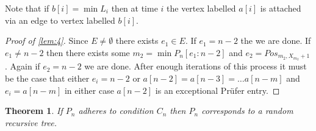 \documentclass[10pt]{article} %
\newtheorem{thm}{Theorem}[section]
\newtheorem{lem}[thm]{Lemma}
\theoremstyle{definition}
\DeclareMathOperator{\Pos}{Pos}
\begin{document}
Note that if $b[i] = \min L_{i}$ then at time $i$ the vertex labelled $a[i]$ is attached via an edge to vertex labelled $b[i]$. 

\begin{proof}[Proof of \ref{lem:4}]
Since $E \neq \emptyset$ there exists $e_{1} \in E$.  If $e_{1} = n-2$ the we are  done.  If $e_{1} \neq n-2$ then there exists some $m_{2} = \min P_{n}[e_{1}:n-2]$ and $e_{2} = Pos_{m_{2},X_{m_{2}}+1}$.  Again if $e_{2} = n-2$ we are done.  After enough iterations of this process it must be the case that either $e_{i} = n-2$ or  $a[n-2] = a[n-3] = \dots a[n-m]$ and $e_{i} = a[n-m]$ in either case $a[n-2]$ is an exceptional Pr\"{u}fer entry. 
\end{proof}






\begin{thm}\label{lem:5}
If $P_{n}$ adheres to condition $C_{n}$ then $P_{n}$ corresponds to a random recursive tree.  
\end{thm}
\end{document}
